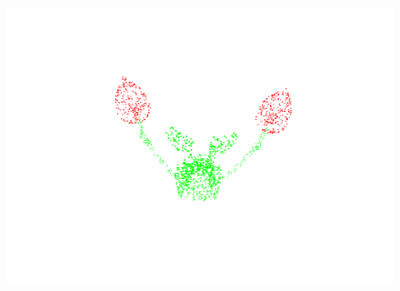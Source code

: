 \begin{figure}[htbp]
\begin{minipage}{0.25\textwidth}
        \centering
        \includegraphics[width=\textwidth]{fig/supplement/part_segmentation/lamp/lamp02.pdf}
    \end{minipage}
    \hfill

    \vspace{0.5em}


\end{figure}
